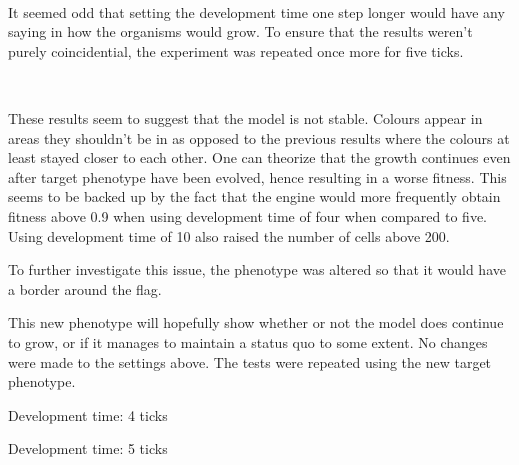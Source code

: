 \begin{center}
	~
	~
\end{center}

It seemed odd that setting the development time one step longer would have any saying in how the organisms would grow. To ensure that the results weren't purely coincidential, the experiment was repeated once more for five ticks.

\begin{center}
	~
	~
\end{center}

These results seem to suggest that the model is not stable. Colours appear in areas they shouldn't be in as opposed to the previous results where the colours at least stayed closer to each other. One can theorize that the growth continues even after target phenotype have been evolved, hence resulting in a worse fitness. This seems to be backed up by the fact that the engine would more frequently obtain fitness above 0.9 when using development time of four when compared to five. Using development time of 10 also raised the number of cells above 200.

To further investigate this issue, the phenotype was altered so that it would have a border around the flag.

\begin{center}\end{center}

This new phenotype will hopefully show whether or not the model does continue to grow, or if it manages to maintain a status quo to some extent. No changes were made to the settings above. The tests were repeated using the new target phenotype.

\begin{center}
	Development time: 4 ticks\newline
	~
\end{center}

\begin{center}
	Development time: 5 ticks\newline
	~
	~
\end{center}

